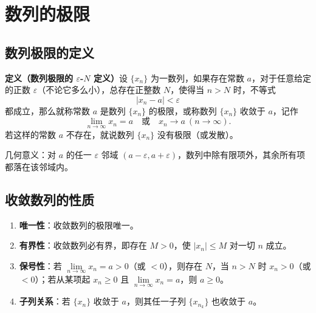 
\section{数列的极限}

\subsection{数列极限的定义}
\textbf{定义（数列极限的 $\varepsilon$-$N$ 定义）}\quad 设 $\{x_n\}$ 为一数列，如果存在常数 $a$，对于任意给定的正数 $\varepsilon$（不论它多么小），总存在正整数 $N$，使得当 $n>N$ 时，不等式
\[
|x_n-a|<\varepsilon
\]
都成立，那么就称常数 $a$ 是数列 $\{x_n\}$ 的极限，或称数列 $\{x_n\}$ 收敛于 $a$，记作
\[
\lim_{n\to\infty}x_n=a\quad\text{或}\quad x_n\to a\ (n\to\infty).
\]
若这样的常数 $a$ 不存在，就说数列 $\{x_n\}$ 没有极限（或发散）。


\noindent 几何意义：对 $a$ 的任一 $\varepsilon$ 邻域 $(a-\varepsilon,a+\varepsilon)$，数列中除有限项外，其余所有项都落在该邻域内。


\subsection{收敛数列的性质}
\begin{enumerate}
    \item \textbf{唯一性}：收敛数列的极限唯一。
    \item \textbf{有界性}：收敛数列必有界，即存在 $M>0$，使 $|x_n|\le M$ 对一切 $n$ 成立。
    \item \textbf{保号性}：若 $\lim\limits_{n\to\infty}x_n=a>0$（或 $<0$），则存在 $N$，当 $n>N$ 时 $x_n>0$（或 $<0$）；若从某项起 $x_n\ge0$ 且 $\lim\limits_{n\to\infty}x_n=a$，则 $a\ge0$。
    \item \textbf{子列关系}：若 $\{x_n\}$ 收敛于 $a$，则其任一子列 $\{x_{n_k}\}$ 也收敛于 $a$。
\end{enumerate}


